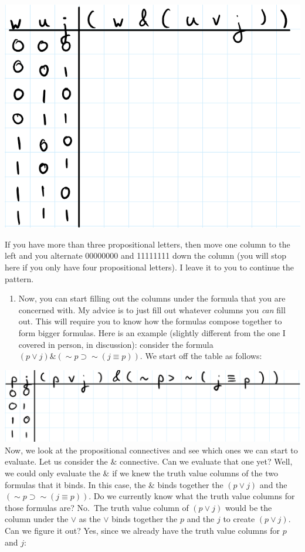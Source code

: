 \documentclass[
]{book}
\providecommand{\tightlist}{%
  \setlength{\itemsep}{0pt}\setlength{\parskip}{0pt}}
\begin{document}
\includegraphics{Pictures/Week4Picture4.png}

If you have more than three propositional letters, then move one column to the left and you alternate 00000000 and 11111111 down the column (you will stop here if you only have four propositional letters). I leave it to you to continue the pattern.

\begin{enumerate}
\def\labelenumi{\arabic{enumi}.}
\setcounter{enumi}{3}
\tightlist
\item
  Now, you can start filling out the columns under the formula that you are concerned with. My advice is to just fill out whatever columns you \emph{can} fill out. This will require you to know how the formulas compose together to form bigger formulas. Here is an example (slightly different from the one I covered in person, in discussion): consider the formula \((p \lor j) \& (\sim p \supset \sim (j \equiv p))\). We start off the table as follows:
\end{enumerate}

\includegraphics{Pictures/Week4Picture5.png}
Now, we look at the propositional connectives and see which ones we can start to evaluate. Let us consider the \(\&\) connective. Can we evaluate that one yet? Well, we could only evaluate the \(\&\) if we knew the truth value columns of the two formulas that it binds. In this case, the \(\&\) binds together the \((p \lor j)\) and the \((\sim p \supset \sim (j \equiv p))\). Do we currently know what the truth value columns for those formulas are? No.~The truth value column of \((p\lor j)\) would be the column under the \(\lor\) as the \(\lor\) binds together the \(p\) and the \(j\) to create \((p \lor j)\). Can we figure it out? Yes, since we already have the truth value columns for \(p\) and \(j\):
\end{document}
